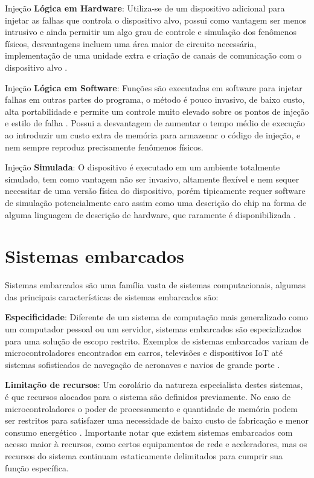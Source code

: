 Injeção \textbf{Lógica em Hardware}: Utiliza-se de um dispositivo adicional para injetar as falhas que controla o dispositivo alvo, possui como vantagem ser menos intrusivo e ainda permitir um algo grau de controle e simulação dos fenômenos físicos, desvantagens incluem uma área maior de circuito necessária, implementação de uma unidade extra e criação de canais de comunicação com o dispositivo alvo \cite{FaultInjectionTechniques}.

Injeção \textbf{Lógica em Software}: Funções são executadas em software para injetar falhas em outras partes do programa, o método é pouco invasivo, de baixo custo, alta portabilidade e permite um controle muito elevado sobre os pontos de injeção e estilo de falha \cite{FaultInjectionTechniques}. Possui a desvantagem de aumentar o tempo médio de execução ao introduzir um custo extra de memória para armazenar o código de injeção, e nem sempre reproduz precisamente fenômenos físicos.

Injeção \textbf{Simulada}: O dispositivo é executado em um ambiente totalmente simulado, tem como vantagem não ser invasivo, altamente flexível e nem sequer necessitar de uma versão física do dispositivo, porém tipicamente requer software de simulação potencialmente caro assim como uma descrição do chip na forma de alguma linguagem de descrição de hardware, que raramente é disponibilizada \cite{FaultInjectionTechniques}.


\section{Sistemas embarcados}

Sistemas embarcados são uma família vasta de sistemas computacionais, algumas das principais características de sistemas embarcados são:

\textbf{Especificidade}: Diferente de um sistema de computação mais generalizado como um computador pessoal ou um servidor, sistemas embarcados são especializados para uma solução de escopo restrito. Exemplos de sistemas embarcados variam de microcontroladores encontrados em carros, televisões e dispositivos IoT até sistemas sofisticados de navegação de aeronaves e navios de grande porte \cite{ComputerOrganizationAndDesign}.

\textbf{Limitação de recursos}: Um corolário da natureza especialista destes sistemas, é que recursos alocados para o sistema são definidos previamente. No caso de microcontroladores o poder de processamento e quantidade de memória podem ser restritos para satisfazer uma necessidade de baixo custo de fabricação e menor consumo energético \cite{ComputerOrganizationAndDesign}. Importante notar que existem sistemas embarcados com acesso maior à recursos, como certos equipamentos de rede e aceleradores, mas os recursos do sistema continuam estaticamente delimitados para cumprir sua função específica.

